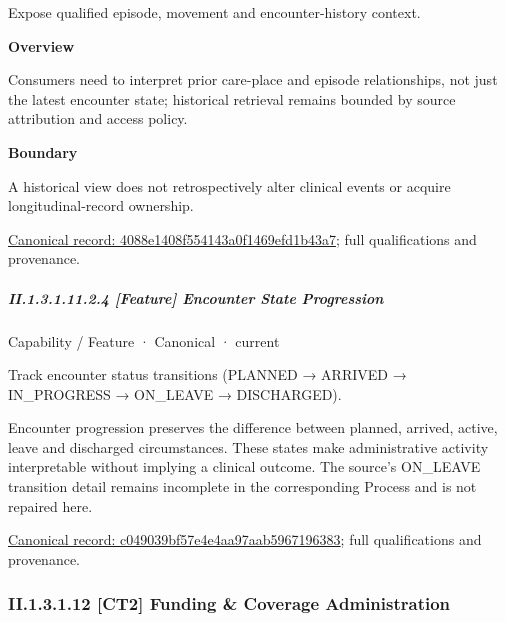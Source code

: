 Expose qualified episode, movement and encounter-history context.



\textbf{Overview}



Consumers need to interpret prior care-place and episode relationships, not just the latest encounter state; historical retrieval remains bounded by source attribution and access policy.



\textbf{Boundary}



A historical view does not retrospectively alter clinical events or acquire longitudinal-record ownership.


{\footnotesize \href{../../../../../../../continuum/strategy/capability/feature/4088e1408f554143a0f1469efd1b43a7.md}{Canonical record: 4088e1408f554143a0f1469efd1b43a7}; full qualifications and provenance.}\par
\subparagraph*{II.1.3.1.11.2.4 [Feature] Encounter State Progression}
\label{navigation:II.1.3.1.11.2.4}

\label{element:c049039bf57e4e4aa97aab5967196383}
{\small Capability / Feature · Canonical · current}\par

Track encounter status transitions (PLANNED → ARRIVED → IN\_PROGRESS → ON\_LEAVE → DISCHARGED).



Encounter progression preserves the difference between planned, arrived, active, leave and discharged circumstances. These states make administrative activity interpretable without implying a clinical outcome. The source's ON\_LEAVE transition detail remains incomplete in the corresponding Process and is not repaired here.


{\footnotesize \href{../../../../../../../continuum/strategy/capability/feature/c049039bf57e4e4aa97aab5967196383.md}{Canonical record: c049039bf57e4e4aa97aab5967196383}; full qualifications and provenance.}\par
\subsubsection*{II.1.3.1.12 [CT2] Funding \& Coverage Administration}
\label{navigation:II.1.3.1.12}

